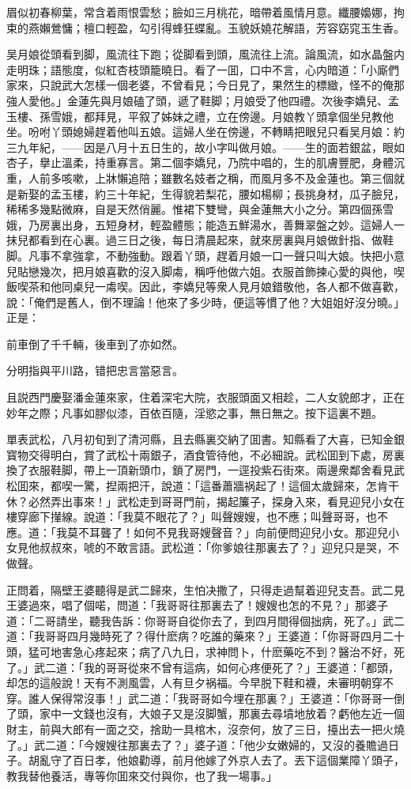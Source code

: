 眉似初春柳葉，常含着雨恨雲愁；臉如三月桃花，暗帶着風情月意。纖腰嬝娜，拘束的燕嬾鶯慵；檀口輕盈，勾引得蜂狂蝶亂。玉貌妖嬈花解語，芳容窈窕玉生香。

吴月娘從頭看到脚，風流往下跑；從脚看到頭，風流往上流。論風流，如水晶盤内走明珠；語態度，似紅杏枝頭籠曉日。看了一囬，口中不言，心内暗道：「小廝們家來，只說武大怎樣一個老婆，不曾看見；今日見了，果然生的標緻，怪不的俺那強人愛他。」金蓮先與月娘磕了頭，遞了鞋脚；月娘受了他四禮。次後李嬌兒、孟玉樓、孫雪娥，都拜見，平叙了姊妹之禮，立在傍邊。月娘教丫頭拿個坐兒教他坐。吩咐丫頭媳婦趕着他叫五娘。這婦人坐在傍邊，不轉睛把眼兒只看吴月娘：約三九年紀，——因是八月十五日生的，故小字叫做月娘。——生的面若銀盆，眼如杏子，擧止溫柔，持重寡言。第二個李嬌兒，乃院中唱的，生的肌膚豐肥，身體沉重，人前多咳嗽，上牀懶追陪；雖數名妓者之稱，而風月多不及金蓮也。第三個就是新娶的孟玉樓，約三十年紀，生得貌若梨花，腰如楊柳；長挑身材，瓜子臉兒，稀稀多幾點微麻，自是天然俏麗。惟裙下雙彎，與金蓮無大小之分。第四個孫雪娥，乃房裏出身，五短身材，輕盈體態；能造五鮮湯水，善舞翠盤之妙。這婦人一抹兒都看到在心裏。過三日之後，每日清晨起來，就來房裏與月娘做針指、做鞋脚。凡事不拿強拿，不動強動。跟着丫頭，趕着月娘一口一聲只叫大娘。快把小意兒貼戀幾次，把月娘喜歡的沒入脚䖏，稱呼他做六姐。衣服首飾揀心愛的與他，喫飯喫茶和他同桌兒一䖏喫。因此，李嬌兒等衆人見月娘錯敬他，各人都不做喜歡，說：「俺們是舊人，倒不理論！他來了多少時，便這等慣了他？大姐姐好沒分曉。」正是：

前車倒了千千輛，後車到了亦如然。

分明指與平川路，错把忠言當惡言。

且説西門慶娶潘金蓮來家，住着深宅大院，衣服頭面又相趁，二人女貌郎才，正在妙年之際；凡事如膠似漆，百依百隨，淫慾之事，無日無之。按下這裏不題。

單表武松，八月初旬到了清河縣，且去縣裏交納了囬書。知縣看了大喜，已知金銀寳物交得明白，賞了武松十兩銀子，酒食管待他，不必細說。武松囬到下處，房裏換了衣服鞋脚，帶上一頂新頭巾，鎖了房門，一逕投紫石街來。兩邊衆鄰舍看見武松囬來，都喫一驚，揑兩把汗，說道：「這番蕭牆祸起了！這個太歲歸來，怎肯干休？必然弄出事來！」武松走到哥哥門前，揭起簾子，探身入來，看見迎兒小女在樓穿廊下攆線。說道：「我莫不眼花了？」叫聲嫂嫂，也不應；叫聲哥哥，也不應。道：「我莫不耳聾了！如何不見我哥嫂聲音？」向前便問迎兒小女。那迎兒小女見他叔叔來，唬的不敢言語。武松道：「你爹娘往那裏去了？」迎兒只是哭，不做聲。

正問着，隔壁王婆聽得是武二歸來，生怕决撒了，只得走過幫着迎兒支吾。武二見王婆過來，唱了個喏，問道：「我哥哥往那裏去了！嫂嫂也怎的不見？」那婆子道：「二哥請坐，聽我告訴：你哥哥自從你去了，到四月間得個拙病，死了。」武二道：「我哥哥四月幾時死了？得什麽病？吃誰的藥來？」王婆道：「你哥哥四月二十頭，猛可地害急心疼起來；病了八九日，求神問卜，什麽藥吃不到？醫治不好，死了。」武二道：「我的哥哥從來不曾有這病，如何心疼便死了？」王婆道：「都頭，却怎的這般說！天有不測風雲，人有旦夕祸福。今早脱下鞋和襪，未審明朝穿不穿。誰人保得常沒事！」武二道：「我哥哥如今埋在那裏？」王婆道：「你哥哥一倒了頭，家中一文錢也沒有，大娘子又是沒脚蟹，那裏去尋墳地放着？虧他左近一個財主，前與大郎有一面之交，捨助一具棺木，沒奈何，放了三日，擡出去一把火燒了。」武二道：「今嫂嫂往那裏去了？」婆子道：「他少女嫩婦的，又沒的養贍過日子。胡亂守了百日孝，他娘勸導，前月他嫁了外京人去了。丟下這個業障丫頭子，教我替他養活，專等你囬來交付與你，也了我一場事。」

